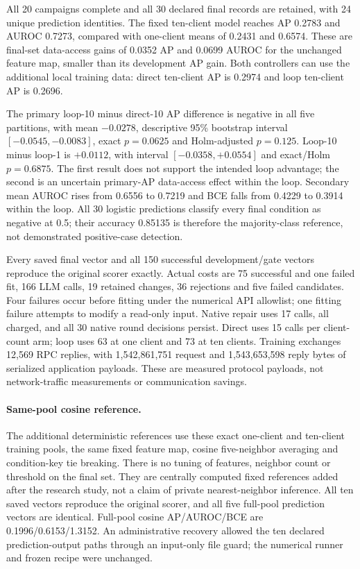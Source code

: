 All 20 campaigns complete and all 30 declared final records are retained, with 24 unique prediction identities. The fixed ten-client model reaches AP 0.2783 and AUROC 0.7273, compared with one-client means of 0.2431 and 0.6574. These are final-set data-access gains of 0.0352 AP and 0.0699 AUROC for the unchanged feature map, smaller than its development AP gain. Both controllers can use the additional local training data: direct ten-client AP is 0.2974 and loop ten-client AP is 0.2696.

The primary loop-10 minus direct-10 AP difference is negative in all five partitions, with mean $-0.0278$, descriptive 95\% bootstrap interval $[-0.0545,-0.0083]$, exact $p=0.0625$ and Holm-adjusted $p=0.125$. Loop-10 minus loop-1 is $+0.0112$, with interval $[-0.0358,+0.0554]$ and exact/Holm $p=0.6875$. The first result does not support the intended loop advantage; the second is an uncertain primary-AP data-access effect within the loop. Secondary mean AUROC rises from 0.6556 to 0.7219 and BCE falls from 0.4229 to 0.3914 within the loop. All 30 logistic predictions classify every final condition as negative at 0.5; their accuracy 0.85135 is therefore the majority-class reference, not demonstrated positive-case detection.

Every saved final vector and all 150 successful development/gate vectors reproduce the original scorer exactly. Actual costs are 75 successful and one failed fit, 166 LLM calls, 19 retained changes, 36 rejections and five failed candidates. Four failures occur before fitting under the numerical API allowlist; one fitting failure attempts to modify a read-only input. Native repair uses 17 calls, all charged, and all 30 native round decisions persist. Direct uses 15 calls per client-count arm; loop uses 63 at one client and 73 at ten clients. Training exchanges 12,569 RPC replies, with 1,542,861,751 request and 1,543,653,598 reply bytes of serialized application payloads. These are measured protocol payloads, not network-traffic measurements or communication savings.

\paragraph{Same-pool cosine reference.}
The additional deterministic references use these exact one-client and ten-client training pools, the same fixed feature map, cosine five-neighbor averaging and condition-key tie breaking. There is no tuning of features, neighbor count or threshold on the final set. They are centrally computed fixed references added after the research study, not a claim of private nearest-neighbor inference. All ten saved vectors reproduce the original scorer, and all five full-pool prediction vectors are identical. Full-pool cosine AP/AUROC/BCE are 0.1996/0.6153/1.3152. An administrative recovery allowed the ten declared prediction-output paths through an input-only file guard; the numerical runner and frozen recipe were unchanged.


